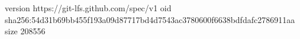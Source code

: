 version https://git-lfs.github.com/spec/v1
oid sha256:54d31b69bb455f193a09d87717bd4d7543ac3780600f6638bdfdafc2786911aa
size 208556
